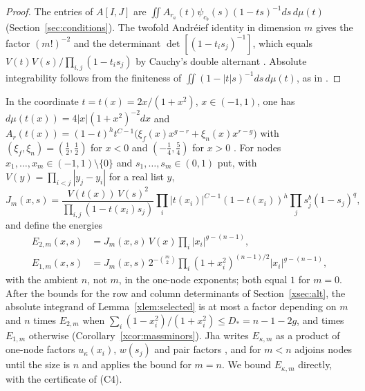 \documentclass[11pt]{article}
\theoremstyle{definition}
\begin{document}
\begin{proof}
The entries of $A[I,J]$ are $\iint A_{r_a}(t)\psi_{c_b}(s)(1-ts)^{-1}ds\,d\mu(t)$ (Section~\ref{sec:conditions}). The twofold Andr\'eief identity in dimension $m$ gives the factor $(m!)^{-2}$ and the determinant $\det[(1-t_is_j)^{-1}]$, which equals $V(t)V(s)/\prod_{i,j}(1-t_is_j)$ by Cauchy's double alternant \cite[Eq.~(63)]{OAI}. Absolute integrability follows from the finiteness of $\iint(1-|t|s)^{-1}ds\,d\mu(t)$, as in \cite[Sec.~5.1]{OAI}.
\end{proof}

In the coordinate $t=t(x)=2x/(1+x^2)$, $x\in(-1,1)$, one has $d\mu(t(x))=4|x|(1+x^2)^{-2}dx$ and $A_r(t(x))=(1-t)^ht^{C-1}\big(\xi_f(x)x^{g-r}+\xi_n(x)x^{r-g}\big)$ with $(\xi_f,\xi_n)=(\frac12,\frac12)$ for $x<0$ and $(-\frac14,\frac54)$ for $x>0$ \cite[Sec.~5.1]{OAI}. For nodes $x_1,\dots,x_m\in(-1,1)\setminus\{0\}$ and $s_1,\dots,s_m\in(0,1)$ put, with $V(y)=\prod_{i<j}|y_j-y_i|$ for a real list $y$,
\[
J_m(x,s)=\frac{V(t(x))\,V(s)^2}{\prod_{i,j}(1-t(x_i)s_j)}\prod_i|t(x_i)|^{C-1}(1-t(x_i))^h\prod_js_j^b(1-s_j)^{q},
\]
and define the energies \cite[Eqs.~(5.1)--(5.3)]{Jha}
\[
\begin{aligned}E_{2,m}(x,s)&=J_m(x,s)\,V(x)\prod_i|x_i|^{g-(n-1)},\\ E_{1,m}(x,s)&=J_m(x,s)\,2^{-\binom m2}\prod_i(1+x_i^2)^{(n-1)/2}|x_i|^{g-(n-1)},\end{aligned}
\]
with the ambient $n$, not $m$, in the one-node exponents; both equal $1$ for $m=0$. After the bounds for the row and column determinants of Section~\ref{xsec:alt}, the absolute integrand of Lemma~\ref{xlem:selected} is at most a factor depending on $m$ and $n$ times $E_{2,m}$ when $\sum_i(1-x_i^2)/(1+x_i^2)\le D_*=n-1-2g$, and times $E_{1,m}$ otherwise (Corollary~\ref{xcor:massminors}). Jha writes $E_{\kappa,m}$ as a product of one-node factors $u_\kappa(x_i)$, $w(s_j)$ and pair factors \cite[Eq.~(5.8)]{Jha}, and for $m<n$ \cite[Proposition~5.4]{Jha} adjoins nodes until the size is $n$ and applies the bound for $m=n$. We bound $E_{\kappa,m}$ directly, with the certificate of (C4).
\end{document}

